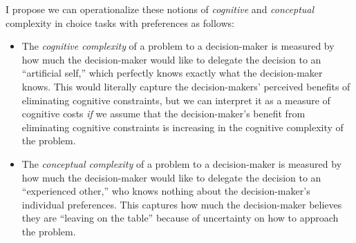 \documentclass[12pt]{article}
\begin{document}
I propose we can operationalize these notions of \textit{cognitive} and \textit{conceptual} complexity in choice tasks with preferences as follows:
\begin{itemize}
  \item The \textit{cognitive complexity} of a problem to a decision-maker is measured by how much the decision-maker would like to delegate the decision to an ``artificial self,'' which perfectly knows exactly what the decision-maker knows. This would literally capture the decision-makers' perceived benefits of eliminating cognitive constraints, but we can interpret it as a measure of cognitive costs \textit{if} we assume that the decision-maker's benefit from eliminating cognitive constraints is increasing in the cognitive complexity of the problem.
  \item The \textit{conceptual complexity} of a problem to a decision-maker is measured by how much the decision-maker would like to delegate the decision to an ``experienced other,'' who knows nothing about the decision-maker's individual preferences. This captures how much the decision-maker believes they are ``leaving on the table'' because of uncertainty on how to approach the problem.
\end{itemize}
\end{document}
